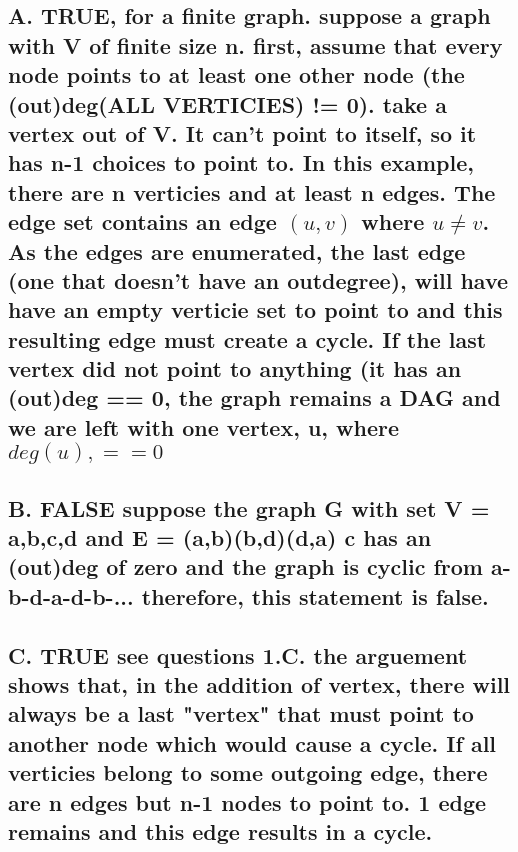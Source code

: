 \documentclass{article}
\begin{document}
\newpage

\setcounter{section}{2}
\setcounter{subsection}{0}
\subsection{
A. TRUE, for a finite graph.\newline
suppose a graph with V of finite size n. first, assume that every node points to at least one other node (the (out)deg(ALL VERTICIES) != 0). take a vertex out of V. It can't point to itself, so it has n-1 choices to point to. In this example, there are n verticies and at least n edges. The edge set contains an edge $(u,v)$ where $u\neq v$. As the edges are enumerated, the last edge (one that doesn't have an outdegree), will have have an empty verticie set to point to and this resulting edge must create a cycle. If the last vertex did not point to anything (it has an (out)deg == 0, the graph remains a DAG and we are left with one vertex, u, where $deg(u), == 0 $
}

\subsection{
B. FALSE\newline
suppose the graph G with set V = {a,b,c,d} and E = {(a,b)(b,d)(d,a)}\newline
c has an (out)deg of zero and the graph is cyclic from a-b-d-a-d-b-...\newline
therefore, this statement is false.
}
\subsection{
C. TRUE\newline
see questions 1.C. the arguement shows that, in the addition of vertex, there will always be a last "vertex" that must point to another node which would cause a cycle. If all verticies belong to some outgoing edge, there are n edges but n-1 nodes to point to. 1 edge remains and this edge results in a cycle.
}
\end{document}
